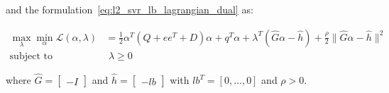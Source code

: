 and the formulation~\ref{eq:l2_svr_lb_lagrangian_dual} as:

\begin{equation} \label{eq:l2_svr_lb_aug_lagrangian_dual}
	\begin{aligned}
    	\max_{\lambda} \min_{\alpha} \mathcal{L}(\alpha,\lambda) &= \frac{1}{2} \alpha^T (Q + ee^T + D) \alpha + q^T \alpha + \lambda^T (\hat{G} \alpha - \hat{h}) + \frac{\rho}{2} \| \hat{G} \alpha - \hat{h} \|^2 \\
    \text{subject to} \quad & \,\, \lambda \geq 0
	\end{aligned}
\end{equation}

where $\hat{G} =
\begin{bmatrix}
-I
\end{bmatrix}$ and $\hat{h} =
\begin{bmatrix}
-lb
\end{bmatrix}$ with $lb^T = [0, \dots, 0]$ and $\rho > 0$.